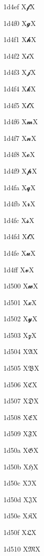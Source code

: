 \documentclass[11pt]{article}
\begin{document}
1d4ef X{\ensuremath{\mathbfscr{f}}}X

1d4f0 X{\ensuremath{\mathbfscr{g}}}X

1d4f1 X{\ensuremath{\mathbfscr{h}}}X

1d4f2 X{\ensuremath{\mathbfscr{i}}}X

1d4f3 X{\ensuremath{\mathbfscr{j}}}X

1d4f4 X{\ensuremath{\mathbfscr{k}}}X

1d4f5 X{\ensuremath{\mathbfscr{l}}}X

1d4f6 X{\ensuremath{\mathbfscr{m}}}X

1d4f7 X{\ensuremath{\mathbfscr{n}}}X

1d4f8 X{\ensuremath{\mathbfscr{o}}}X

1d4f9 X{\ensuremath{\mathbfscr{p}}}X

1d4fa X{\ensuremath{\mathbfscr{q}}}X

1d4fb X{\ensuremath{\mathbfscr{r}}}X

1d4fc X{\ensuremath{\mathbfscr{s}}}X

1d4fd X{\ensuremath{\mathbfscr{t}}}X

1d4fe X{\ensuremath{\mathbfscr{u}}}X

1d4ff X{\ensuremath{\mathbfscr{v}}}X

1d500 X{\ensuremath{\mathbfscr{w}}}X

1d501 X{\ensuremath{\mathbfscr{x}}}X

1d502 X{\ensuremath{\mathbfscr{y}}}X

1d503 X{\ensuremath{\mathbfscr{z}}}X

1d504 X{\ensuremath{\mathfrak{A}}}X

1d505 X{\ensuremath{\mathfrak{B}}}X

1d506 X{\ensuremath{\mathfrak{C}}}X

1d507 X{\ensuremath{\mathfrak{D}}}X

1d508 X{\ensuremath{\mathfrak{E}}}X

1d509 X{\ensuremath{\mathfrak{F}}}X

1d50a X{\ensuremath{\mathfrak{G}}}X

1d50b X{\ensuremath{\mathfrak{H}}}X

1d50c X{\ensuremath{\mathfrak{I}}}X

1d50d X{\ensuremath{\mathfrak{J}}}X

1d50e X{\ensuremath{\mathfrak{K}}}X

1d50f X{\ensuremath{\mathfrak{L}}}X

1d510 X{\ensuremath{\mathfrak{M}}}X
\end{document}
